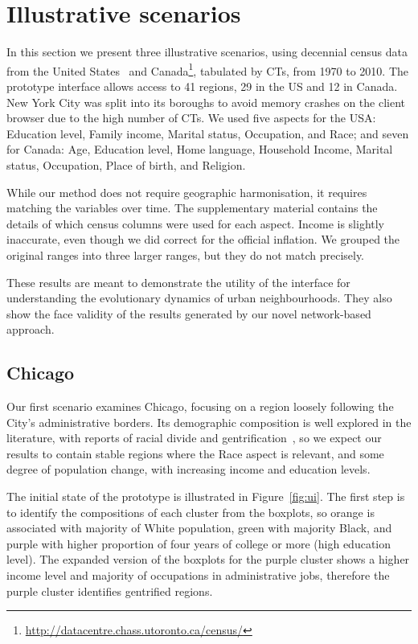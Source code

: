 \section{Illustrative scenarios}
\label{sec:study}

In this section we present three illustrative scenarios, using decennial census
data from the United States~\citep{nhgis} and
Canada\footnote{\url{http://datacentre.chass.utoronto.ca/census/}}, tabulated by
CTs,  from 1970 to 2010. The prototype interface allows access to 41 regions, 29
in the US and 12 in Canada. New York City was split into its boroughs to avoid
memory crashes on the client browser due to the high number of CTs.  We used
five aspects for the USA: Education level, Family income, Marital status,
Occupation, and Race; and seven for Canada: Age, Education level, Home language,
Household Income, Marital status, Occupation, Place of birth, and Religion. 

While our method does not require geographic harmonisation, it requires matching
the variables over time. The supplementary material contains the details of
which census columns were used for each aspect. Income is slightly inaccurate,
even though we did correct for the official inflation. We grouped the original
ranges into three larger ranges, but they do not match precisely.

These results are meant to demonstrate the utility of the interface for
understanding the evolutionary dynamics of urban neighbourhoods. They also show
the face validity of the results generated by our novel network-based approach.

\subsection{Chicago}
Our first scenario examines Chicago, focusing on a region loosely following the
City's administrative borders. Its demographic composition is well explored in
the literature, with reports of racial divide and
gentrification~\citep{Delmelle2016,Delmelle2017,Hwang2014}, so we expect our
results to contain stable regions where the Race aspect is relevant, and some
degree of population change, with increasing income and education levels. 


The initial state of the prototype is illustrated in Figure~\ref{fig:ui}. The
first step is to identify the compositions of each cluster from the boxplots, so
orange is associated with majority of White population, green with majority
Black, and purple with higher proportion of four years of college or more (high
education level). The expanded version of the boxplots for the purple cluster
shows a higher income level and majority of occupations in administrative jobs,
therefore the purple cluster identifies gentrified regions.



